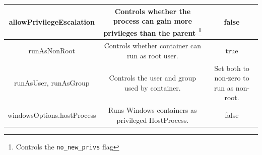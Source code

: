 \documentclass[english, 12pt, a4paper, sci, utf8, a-2b, online]{aaltothesis}
\begin{document}
\begin{table}[H]
\begin{minipage}{\textwidth}
\begin{tabularx}{\textwidth}{CCC}
    allowPrivilegeEscalation & Controls whether the process can gain more privileges than the parent \footnote{Controls the \texttt{no\_new\_privs} flag} & false \\ \hline
    runAsNonRoot & Controls whether container can run as root user. & true \\ \hline
    runAsUser, runAsGroup & Controls the user and group used by container. & Set both to non-zero to run as non-root. \\ \hline
    windowsOptions.hostProcess & Runs Windows containers as privileged HostProcess. & false \\ \hline
  \end{tabularx}
  \end{minipage}
\end{table}



\end{document}
